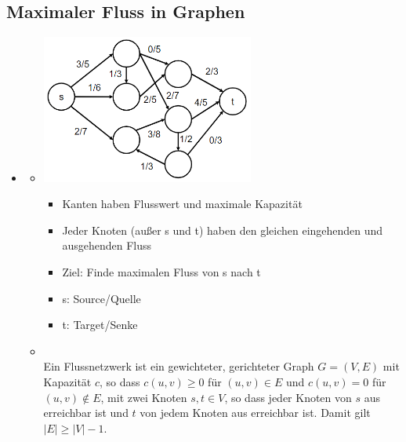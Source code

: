 \documentclass[
    12pt,
    a4paper,
    ngerman,
    color=3b,%
    marginpar=false,
    colorback=false,
    leqno,
]{tudaexercise}
\begin{document}
\subsection{Maximaler Fluss in Graphen}
    \begin{itemize}
        \item {}
            \begin{itemize}
                \item[]
                    \begin{minipage}{0.35\textwidth}
                        \includegraphics[width=7cm]{pictures/flussIdee.PNG}
                    \end{minipage}
                    \begin{minipage}{0.55\textwidth}
                        \begin{itemize}
                            \item Kanten haben Flusswert und maximale Kapazität
                            \item Jeder Knoten (außer s und t) haben den gleichen eingehenden und ausgehenden Fluss
                            \item Ziel: Finde maximalen Fluss von s nach t
                            \item s: Source/Quelle
                            \item t: Target/Senke
                        \end{itemize}
                    \end{minipage}
                \item {} \\
                        Ein Flussnetzwerk ist ein gewichteter, gerichteter Graph $G=(V,E)$ mit Kapazität $c$, so dass
                        $c(u,v) \geq 0$ für $(u,v) \in E$ und $c(u,v) = 0$ für $(u,v) \notin E$, mit zwei Knoten $s,t \in V$,
                        so dass jeder Knoten von $s$ aus erreichbar ist und $t$ von jedem Knoten aus erreichbar ist. 
                        Damit gilt $|E| \geq |V| - 1$.

\end{itemize}
\end{itemize}
\end{document}
